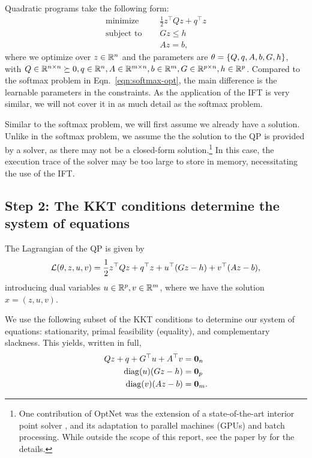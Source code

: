 \documentclass[11pt]{article}
\begin{document}
Quadratic programs take the following form:
\begin{equation}
\label{eqn:qp}
\begin{aligned}
\textrm{minimize } \quad & \frac12 z^\top Q z + q^\top z\\
\textrm{subject to } \quad
& Gz \leq h\\
& Az = b,
\end{aligned}
\end{equation}
where we optimize over $z\in\mathbb{R}^n$ and the parameters are $\theta = \left\{Q, q, A, b, G, h\right\}$,
with $Q\in\mathbb{R}^{n\times n}\succeq0, q\in\mathbb{R}^n, A\in\mathbb{R}^{m\times n},b\in\mathbb{R}^{m},G\in\mathbb{R}^{p\times n},
h\in\mathbb{R}^p$.
Compared to the softmax problem in Eqn.~\ref{eqn:softmax-opt},
the main difference is the learnable parameters in the constraints.
As the application of the IFT is very similar, we will not cover it in as much
detail as the softmax problem.

Similar to the softmax problem, we will first assume we already have a solution.
Unlike in the softmax problem, we assume the the solution to the QP is provided by a solver,
as there may not be a closed-form solution.\footnote{
One contribution of OptNet was the extension of a state-of-the-art interior point
solver \citep{optnet}, and its adaptation to parallel machines (GPUs) and batch processing.
While outside the scope of this report, see the paper by \citet{optnet} for the details.
}
In this case, the execution trace of the solver may be too large to store in memory,
necessitating the use of the IFT.

\subsection*{Step 2: The KKT conditions determine the system of equations}
The Lagrangian of the QP is given by
$$
\mathcal{L}(\theta,z,u,v) = \frac12 z^\top Qz + q^\top z + u^\top(Gz-h) + v^\top(Az-b),
$$
introducing dual variables $u\in\mathbb{R}^p,v\in\mathbb{R}^m$,
where we have the solution $x = (z,u,v)$.

We use the following subset of the KKT conditions to determine our system of equations:
stationarity, primal feasibility (equality), and complementary slackness.
This yields, written in full,
\begin{equation}
\begin{aligned}
Qz + q + G^\top u + A^\top v  &= \mathbf{0}_n\\
\mathrm{diag}(u)(Gz-h) &= \mathbf{0}_p\\
\mathrm{diag}(v)(Az-b) &= \mathbf{0}_m.
\end{aligned}
\end{equation}
\end{document}
